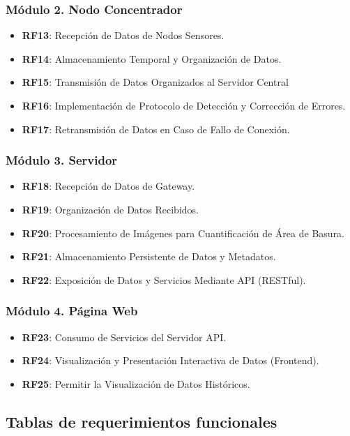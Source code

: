 \subsubsection*{Módulo 2. Nodo Concentrador}
\begin{itemize}
    \item \textbf{RF13}: Recepción de Datos de Nodos Sensores.
    \item \textbf{RF14}: Almacenamiento Temporal y Organización de Datos.
    \item \textbf{RF15}: Transmisión de Datos Organizados al Servidor Central
    \item \textbf{RF16}: Implementación de Protocolo de Detección y Corrección de Errores.
    \item \textbf{RF17}: Retransmisión de Datos en Caso de Fallo de Conexión.
\end{itemize}

\subsubsection*{Módulo 3. Servidor}
\begin{itemize}
    \item \textbf{RF18}: Recepción de Datos de Gateway.
    \item \textbf{RF19}: Organización de Datos Recibidos.
    \item \textbf{RF20}: Procesamiento de Imágenes para Cuantificación de Área de Basura.
    \item \textbf{RF21}: Almacenamiento Persistente de Datos y Metadatos.
    \item \textbf{RF22}: Exposición de Datos y Servicios Mediante API (RESTful).
\end{itemize}

\subsubsection*{Módulo 4. Página Web}
\begin{itemize}
    \item \textbf{RF23}: Consumo de Servicios del Servidor API.
    \item \textbf{RF24}: Visualización y Presentación Interactiva de Datos (Frontend).
    \item \textbf{RF25}: Permitir la Visualización de Datos Históricos.
\end{itemize}


\subsection*{Tablas de requerimientos funcionales}

